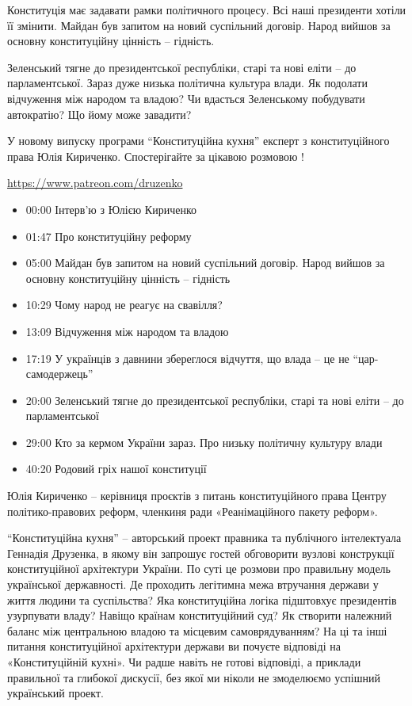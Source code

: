 \begin{multicols}{2}
Конституція має задавати рамки політичного процесу. Всі наші президенти хотіли
її змінити. Майдан був запитом на новий суспільний договір. Народ вийшов за
основну конституційну цінність – гідність.

Зеленський тягне до президентської  республіки, старі та нові еліти – до
парламентської. Зараз дуже низька політична культура влади. Як подолати
відчуження між народом та владою? Чи вдасться Зеленському побудувати
автократію? Що йому може завадити?

У новому випуску програми \enquote{Конституційна кухня} експерт з конституційного права
Юлія Кириченко. Спостерігайте за цікавою розмовою !

\url{https://www.patreon.com/druzenko}

\begin{itemize}
  \item 00:00 Інтерв’ю з Юлією Кириченко 
  \item 01:47 Про конституційну реформу 
  \item 05:00 Майдан був запитом на новий суспільний договір. Народ вийшов за основну конституційну цінність – гідність
  \item 10:29 Чому народ не реагує на свавілля?
  \item 13:09 Відчуження між народом та владою
  \item 17:19 У українців з давнини збереглося відчуття, що влада – це не \enquote{цар-самодержець}
  \item 20:00 Зеленський тягне до президентської  республіки, старі та нові еліти – до парламентської
  \item 29:00 Кто за кермом України зараз. Про низьку політичну культуру влади
  \item 40:20 Родовий гріх нашої конституції
\end{itemize}

Юлія Кириченко – керівниця проєктів з питань конституційного права Центру
політико-правових реформ, членкиня ради «Реанімаційного пакету реформ».

\enquote{Конституційна кухня} – авторський проект правника та публічного інтелектуала
Геннадія Друзенка, в якому він запрошує гостей обговорити вузлові конструкції
конституційної архітектури України. По суті це розмови про правильну модель
української державності. Де проходить легітимна межа втручання держави у життя
людини та суспільства? Яка конституційна логіка підштовхує президентів
узурпувати владу? Навіщо країнам конституційний суд? Як створити належний
баланс між центральною владою та місцевим самоврядуванням? На ці та інші
питання конституційної архітектури держави ви почуєте відповіді на
«Конституційній кухні». Чи радше навіть не готові відповіді, а приклади
правильної та глибокої дискусії, без якої ми ніколи не змоделюємо успішний
український проект.

\end{multicols}

